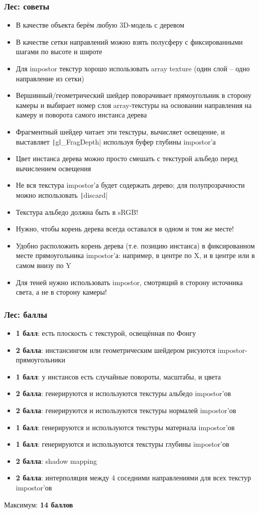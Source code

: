 \documentclass{beamer}
\begin{document}
\begin{frame}[fragile]
\frametitle{Лес: советы}
\fontsize{8pt}{8pt}
\selectfont
\begin{itemize}
\item В качестве объекта берём любую 3D-модель с деревом
\item В качестве сетки направлений можно взять полусферу с фиксированными шагами по высоте и широте
\item Для impostor текстур хорошо использовать array texture (один слой -- одно направление из сетки)
\item Вершинный/геометрический шейдер поворачивает прямоугольник в сторону камеры и выбирает номер слоя array-текстуры на основании направления на камеру и поворота самого инстанса дерева
\item Фрагментный шейдер читает эти текстуры, вычисляет освещение, и выставляет \texttt|gl_FragDepth| используя буфер глубины impostor'а
\item Цвет инстанса дерева можно просто смешать с текстурой альбедо перед вычислением освещения 
\item Не вся текстура impostor'а будет содержать дерево; для полупрозрачности можно использовать \texttt|discard|
\item Текстура альбедо должна быть в sRGB!
\item Нужно, чтобы корень дерева всегда оставался в одном и том же месте!
\item Удобно расположить корень дерева (т.е. позицию инстанса) в фиксированном месте прямоугольника impostor'а: например, в центре по X, и в центре или в самом внизу по Y
\item Для теней нужно использовать impostor, смотрящий в сторону источника света, а не в сторону камеры!
\end{itemize}
\end{frame}

\begin{frame}[fragile]
\frametitle{Лес: баллы}
\fontsize{8pt}{8pt}
\selectfont
\begin{itemize}
\item \textbf{1 балл}: есть плоскость с текстурой, освещённая по Фонгу
\item \textbf{2 балла}: инстансингом или геометрическим шейдером рисуются impostor-прямоугольники
\item \textbf{1 балл}: у инстансов есть случайные повороты, масштабы, и цвета
\item \textbf{2 балла}: генерируются и используются текстуры альбедо impostor'ов
\item \textbf{2 балла}: генерируются и используются текстуры нормалей impostor'ов
\item \textbf{1 балл}: генерируются и используются текстуры материала impostor'ов
\item \textbf{1 балл}: генерируются и используются текстуры глубины impostor'ов
\item \textbf{2 балла}: shadow mapping
\item \textbf{2 балла}: интерполяция между 4 соседними направлениями для всех текстур impostor'ов
\end{itemize}
Максимум: \textbf{14 баллов}
\end{frame}
\end{document}
